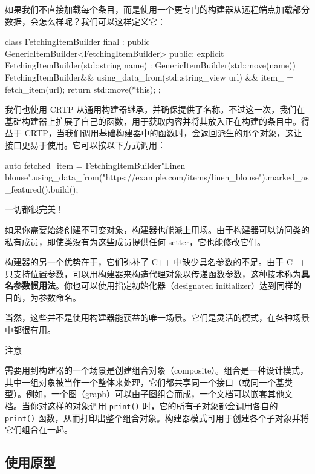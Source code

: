 如果我们不直接加载每个条目，而是使用一个更专门的构建器从远程端点加载部分数据，会怎么样呢？我们可以这样定义它：

\begin{codebox}[cpp]
class FetchingItemBuilder final
    : public GenericItemBuilder<FetchingItemBuilder> {
public:
    explicit FetchingItemBuilder(std::string name)
        : GenericItemBuilder(std::move(name)) {}
    FetchingItemBuilder&& using_data_from(std::string_view url) && {
        item_ = fetch_item(url);
        return std::move(*this);
    }
};
\end{codebox}

我们也使用 CRTP 从通用构建器继承，并确保提供了名称。不过这一次，我们在基础构建器上扩展了自己的函数，用于获取内容并将其放入正在构建的条目中。得益于 CRTP，当我们调用基础构建器中的函数时，会返回派生的那个对象，这让接口更易于使用。它可以按以下方式调用：

\begin{codebox}[text]
auto fetched_item = FetchingItemBuilder{"Linen blouse"}.using_data_from("https://example.com/items/linen_blouse").marked_as_featured().build();
\end{codebox}

一切都很完美！

如果你需要始终创建不可变对象，构建器也能派上用场。由于构建器可以访问类的私有成员，即使类没有为这些成员提供任何 setter，它也能修改它们。

\label{idx:585}
构建器的另一个优势在于，它们弥补了 C++ 中缺少具名参数的不足。由于 C++ 只支持位置参数，可以用构建器来构造代理对象以传递函数参数，这种技术称为\textbf{具名参数惯用法}。你也可以使用指定初始化器（designated initializer）达到同样的目的，为参数命名。

\label{idx:586}
当然，这些并不是使用构建器能获益的唯一场景。它们是灵活的模式，在各种场景中都很有用。

\begin{myNotic}{注意}

需要用到构建器的一个场景是创建组合对象（composite）。组合是一种设计模式，其中一组对象被当作一个整体来处理，它们都共享同一个接口（或同一个基类型）。例如，一个图（graph）可以由子图组合而成，一个文档可以嵌套其他文档。当你对这样的对象调用 \texttt{print()} 时，它的所有子对象都会调用各自的 \texttt{print()} 函数，从而打印出整个组合对象。构建器模式可用于创建各个子对象并将它们组合在一起。
\end{myNotic}

\subsection{使用原型}

